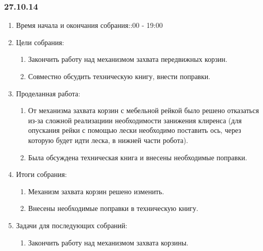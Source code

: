 	
\subsubsection{27.10.14}

\begin{enumerate}
	\item Время начала и окончания собрания::00 - 19:00
	\item Цели собрания:\newline
	\begin{enumerate}
	  \item Закончить работу над механизмом захвата передвижных корзин.\newline
	  
	  \item Совместно обсудить техническую книгу, внести поправки.\newline
	  
    \end{enumerate}
    
	\item Проделанная работа:\newline
	\begin{enumerate}
	  \item От механизма захвата корзин с мебельной рейкой было решено отказаться из-за сложной реализациии необходимости занижения клиренса (для опускания рейки с помощью лески необходимо поставить ось, через которую будет идти леска, в нижней части робота).\newline
      
      \item Была обсуждена техническая книга и внесены необходимые поправки.\newline
      
    \end{enumerate}
    
	\item Итоги собрания: \newline
	\begin{enumerate}
	  \item Механизм захвата корзин решено изменить.\newline
	  
	  \item Внесены необходимые поправки в техническую книгу.\newline
      
    \end{enumerate}
    
	\item Задачи для последующих собраний:\newline
	\begin{enumerate}
	  \item Закончить работу над механизмом захвата корзины.\newline
	  
    \end{enumerate}     
\end{enumerate}

\fillpage
